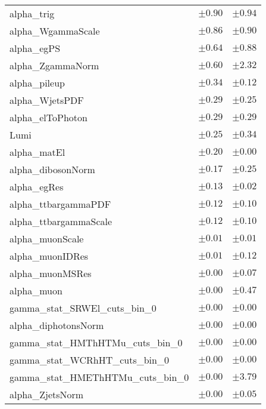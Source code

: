 \begin{table}
\begin{center}
\begin{tabular*}{\textwidth}{@{\extracolsep{\fill}}lcc}
alpha\_trig         & $\pm 0.90$          & $\pm 0.94$       \\
alpha\_WgammaScale         & $\pm 0.86$          & $\pm 0.90$       \\
alpha\_egPS         & $\pm 0.64$          & $\pm 0.88$       \\
alpha\_ZgammaNorm         & $\pm 0.60$          & $\pm 2.32$       \\
alpha\_pileup         & $\pm 0.34$          & $\pm 0.12$       \\
alpha\_WjetsPDF         & $\pm 0.29$          & $\pm 0.25$       \\
alpha\_elToPhoton         & $\pm 0.29$          & $\pm 0.29$       \\
Lumi         & $\pm 0.25$          & $\pm 0.34$       \\
alpha\_matEl         & $\pm 0.20$          & $\pm 0.00$       \\
alpha\_dibosonNorm         & $\pm 0.17$          & $\pm 0.25$       \\
alpha\_egRes         & $\pm 0.13$          & $\pm 0.02$       \\
alpha\_ttbargammaPDF         & $\pm 0.12$          & $\pm 0.10$       \\
alpha\_ttbargammaScale         & $\pm 0.12$          & $\pm 0.10$       \\
alpha\_muonScale         & $\pm 0.01$          & $\pm 0.01$       \\
alpha\_muonIDRes         & $\pm 0.01$          & $\pm 0.12$       \\
alpha\_muonMSRes         & $\pm 0.00$          & $\pm 0.07$       \\
alpha\_muon         & $\pm 0.00$          & $\pm 0.47$       \\
gamma\_stat\_SRWEl\_cuts\_bin\_0         & $\pm 0.00$          & $\pm 0.00$       \\
alpha\_diphotonsNorm         & $\pm 0.00$          & $\pm 0.00$       \\
gamma\_stat\_HMThHTMu\_cuts\_bin\_0         & $\pm 0.00$          & $\pm 0.00$       \\
gamma\_stat\_WCRhHT\_cuts\_bin\_0         & $\pm 0.00$          & $\pm 0.00$       \\
gamma\_stat\_HMEThHTMu\_cuts\_bin\_0         & $\pm 0.00$          & $\pm 3.79$       \\
alpha\_ZjetsNorm         & $\pm 0.00$          & $\pm 0.05$       \\

\end{tabular*}
\end{center}
\end{table}

